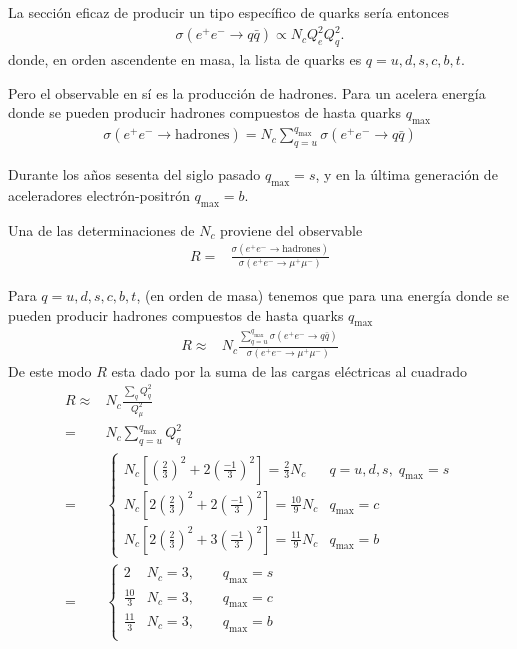 \begin{frame}
La sección eficaz de producir un tipo específico de quarks sería entonces
\begin{align}
 \sigma(e^+e^-\to q\bar{q}) \propto N_c Q_e^2 Q_q^2 .
\end{align}
donde, en orden ascendente en masa, la lista de quarks es $q=u,d,s,c,b,t$.

Pero el observable en sí es la producción de hadrones. Para un acelera energía donde se pueden producir hadrones compuestos de hasta  quarks $q_{\text{max}}$
\begin{align}
  \sigma(e^+e^-\to\text{hadrones})=N_c \sum_{q=u}^{q_{\text{max}}} \sigma(e^+e^-\to q\bar{q}) 
\end{align}

Durante los años sesenta del siglo pasado $q_{\text{max}}=s$, y en la última generación de aceleradores electrón-positrón $q_{\text{max}}=b$.


Una de las determinaciones de $N_c$ proviene del observable
\begin{align}
  R=&\frac{\sigma(e^+e^-\to\text{hadrones})}{\sigma(e^+e^-\to\mu^+\mu^-)}
\end{align}

Para $q=u,d,s,c,b,t$, (en orden de masa) tenemos que para una energía donde se pueden producir hadrones compuestos de hasta  quarks $q_{\text{max}}$
\begin{align}
   R\approx&N_c\frac{\sum_{q=u}^{q_{\text{max}}}\sigma(e^+e^-\to q\bar{q})}{\sigma(e^+e^-\to\mu^+\mu^-)}
\end{align}
De este modo $R$ esta dado por la suma de las cargas eléctricas al cuadrado
\begin{align}
\label{eq:254qft}
R\approx&N_c\frac{\sum_q Q_q^2}{Q_\mu^2}\nonumber\\
=
&N_c\sum_{q=u}^{q_{\text{max}}} Q_q^2\nonumber\\
=&
\begin{cases}
  N_c[(\frac{2}{3})^2+2(\frac{-1}{3})^2]=\frac{2}{3}N_c&q=u,d,s,\;q_{\text{max}}=s\\
  N_c[2(\frac{2}{3})^2+2(\frac{-1}{3})^2]=\frac{10}{9}N_c&q_{\text{max}}=c\\
  N_c[2(\frac{2}{3})^2+3(\frac{-1}{3})^2]=\frac{11}{9}N_c&q_{\text{max}}=b
\end{cases}\nonumber\\
=&
\begin{cases}
  2&N_c=3,\qquad q_{\text{max}}=s\\
  \frac{10}{3}&N_c=3,\qquad q_{\text{max}}=c\\
  \frac{11}{3}&N_c=3,\qquad q_{\text{max}}=b\\
\end{cases}
\end{align}
\end{frame}
